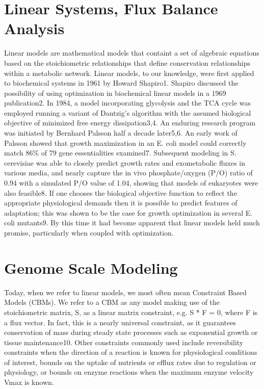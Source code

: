 \documentclass[phd,tocprelim]{cornell}
\theoremstyle{break}
\theoremstyle{empty}
\begin{document}
\section{Linear Systems, Flux Balance Analysis}
Linear models are mathematical models that containt a set of algebraic
equations based on the stoichiometric relationships that define
conservation relationships within a metabolic network.  Linear models,
to our knowledge, were first applied to biochemical systems in 1961 by
Howard Shapiro1. Shapiro discussed the possibility of using
optimization in biochemical linear models in a 1969 publication2. In
1984, a model incorporating glycolysis and the TCA cycle was employed
running a variant of Dantzig’s algorithm with the assumed biological
objective of minimized free energy dissipation3,4. An enduring
research program was initiated by Bernhard Palsson half a decade
later5,6.  An early work of Palsson showed that growth maximization in
an E. coli model could correctly match 86\% of 79 gene essentialities
examined7. Subsequent modeling in S. cerevisiae was able to closely
predict growth rates and exometabolic fluxes in various media, and
nearly capture the in vivo phosphate/oxygen (P/O) ratio of 0.94 with a
simulated P/O value of 1.04, showing that models of eukaryotes were
also feasible8. If one chooses the biological objective function to
reflect the appropriate physiological demands then it is possible to
predict features of adaptation; this was shown to be the case for
growth optimization in several E. coli mutants9. By this time it had
become apparent that linear models held much promise, particularly
when coupled with optimization.


\section{Genome Scale Modeling}
Today, when we refer to linear models, we most often mean Constraint
Based Models (CBMs). We refer to a CBM as any model making use of the
stoichiometric matrix, S, as a linear matrix constraint, e.g. S * F =
0, where F is a flux vector. In fact, this is a nearly universal
constraint, as it guarantees conservation of mass during steady state
processes such as exponential growth or tissue maintenance10. Other
constraints commonly used include reversibility constraints when the
direction of a reaction is known for physiological conditions of
interest, bounds on the uptake of nutrients or efflux rates due to
regulation or physiology, or bounds on enzyme reactions when the
maximum enzyme velocity Vmax is known.
\end{document}
